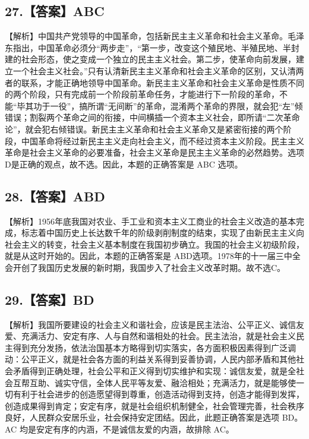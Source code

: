 \documentclass[UTF8,11pt]{ctexart}
\begin{document}
\subsection*{27.【答案】ABC}

【解析】中国共产党领导的中国革命，包括新民主主义革命和社会主义革命。毛泽东指出，中国革命必须分“两步走”，“第一步，改变这个殖民地、半殖民地、半封建的社会形态，使之变成一个独立的民主主义社会。第二步，使革命向前发展，建立一个社会主义社会。”只有认清新民主主义革命和社会主义革命的区别，又认清两者的联系，才能正确地领导中国革命。新民主主义革命和社会主义革命是性质不同的两个阶段，只有完成前一个阶段前革命任务，才能进行下一阶段的革命，不能“毕其功于一役”，搞所谓“无间断”的革命，混淆两个革命的界限，就会犯“左”倾错误；割裂两个革命之间的衔接，中间横插一个资本主义社会，即所请“二次革命论”，就会犯右倾错误。新民主主义革命和社会主义革命又是紧密衔接的两个阶段，中国革命将经过新民主主义走向社会主义，而不经过资本主义阶段。民主主义革命是社会主义革命的必要准备，社会主义革命是民主主义革命的必然趋势。选项D是正确的观点，故不选。因此，本题的正确答案是 ABC 选项。


\subsection*{28.【答案】ABD}

【解析】1956年底我国对农业、手工业和资本主义工商业的社会主义改造的基本完成，标志着中国历史上长达数千年的阶级剥削制度的结束，实现了由新民主主义向社会主义的转变，社会主义基本制度在我国初步确立。我国的社会主义初级阶段，就是从这时开始的。因此，本题的正确答案是 ABD选项。1978年的十一届三中全会开创了我国历史发展的新时期，我国步入了社会主义改革时期。故不选C。


\subsection*{29.【答案】BD}

【解析】我国所要建设的社会主义和谐社会，应该是民主法治、公平正义、诚信友爱、充满活力、安定有序、人与自然和谐相处的社会。民主法治，就是社会主义民主得到充分发扬，依法治国基本方略得到切实落实，各方面积极因素得到广泛调动：公平正义，就是社会各方面的利益关系得到妥善协调，人民内部矛盾和其他社会矛盾得到正确处理，社会公平和正义得到切实维护和实现：诚信友爱，就是全社会互帮互助、诚实守信，全体人民平等友爱、融洽相处；充满活力，就是能够使一切有利于社会进步的创造愿望得到尊重，创造活动得到支持，创造才能得到发挥，创造成果得到肯定；安定有序，就是社会组织机制健全，社会管理完善，社会秩序良好，人民群众安居乐业，社会保持安定团结。因此，此题正确答案是选项 BD。AC 均是安定有序的内涵，不是诚信友爱的内涵，故排除 AC。
\end{document}
